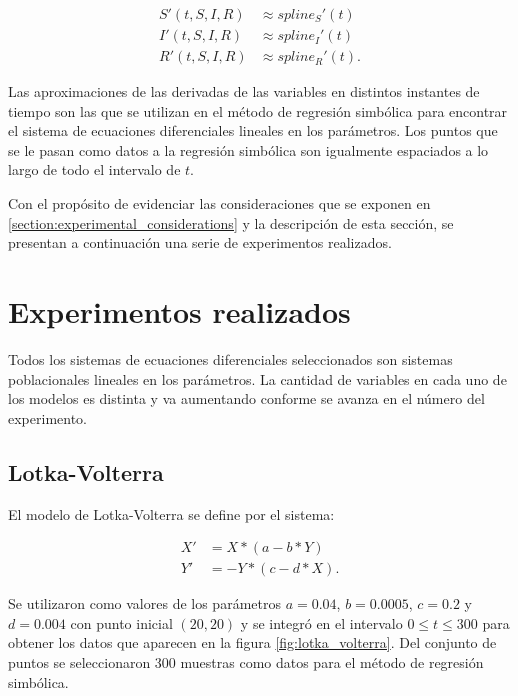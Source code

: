 \begin{align*}
    S'(t, S, I, R) & \approx spline_S'(t)  \\
    I'(t, S, I, R) & \approx spline_I'(t)  \\
    R'(t, S, I, R) & \approx spline_R'(t).
\end{align*}

Las aproximaciones de las derivadas de las variables en distintos instantes de tiempo son las que se utilizan en el método de regresión simbólica para encontrar el sistema de ecuaciones diferenciales lineales en los parámetros. Los puntos que se le pasan como datos a la regresión simbólica son igualmente espaciados a lo largo de todo el intervalo de $t$.

Con el propósito de evidenciar las consideraciones que se exponen en \ref{section:experimental_considerations} y la descripción de esta sección, se presentan a continuación una serie de experimentos realizados.

\section{Experimentos realizados}\label{section:experiments}

Todos los sistemas de ecuaciones diferenciales seleccionados son sistemas poblacionales lineales en los parámetros. La cantidad de variables en cada uno de los modelos es distinta y va aumentando conforme se avanza en el número del experimento.

\subsection{Lotka-Volterra}

El modelo de Lotka-Volterra se define por el sistema:

\begin{align*}
    X' & = X * (a - b * Y)   \\
    Y' & = -Y * (c - d * X).
\end{align*}

Se utilizaron como valores de los parámetros $a = 0.04$, $b = 0.0005$, $c = 0.2$ y $d = 0.004$ con punto inicial $(20, 20)$ y se integró en el intervalo $0 \leq t \leq 300$ para obtener los datos que aparecen en la figura \ref{fig:lotka_volterra}. Del conjunto de puntos se seleccionaron 300 muestras como datos para el método de regresión simbólica.

